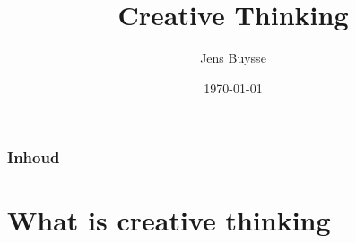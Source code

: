 \documentclass[notes]{beamer}
\title[Intro]{Creative Thinking}
\author{Jens Buysse}
\date{\today}
\begin{document}

\HoGentLogo

\titleframe


\begin{frame}
  \frametitle{Inhoud}

  \tableofcontents
\end{frame}

\section{What is creative thinking}

\end{document}
